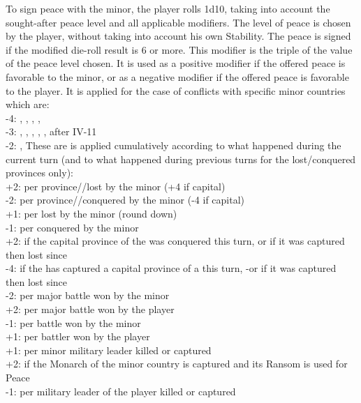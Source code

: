\aparag[Method]
To sign peace with the minor, the player rolls 1d10, taking into account the
sought-after peace level and all applicable modifiers. The level of peace is
chosen by the player, without taking into account his own Stability.
\bparag[Result]
The peace is signed if the modified die-roll result is 6 or more.
This modifier is the triple of the value of the peace level chosen. It is used
as a positive modifier if the offered peace is favorable to the minor, or as a
negative modifier if the offered peace is favorable to the player.
It is applied for the case of conflicts with specific minor countries
which are: \\
-4: , , , ,
 \\
-3: , , , ,
,   after IV-11\\
-2: , 
These are is applied cumulatively according to what happened during the
current turn (and to what happened during previous turns for the
lost/conquered provinces only):\\
+2:	per province/\TP\faceplus/\COL lost by the minor (+4 if capital)\\
-2:	per province/\TP\faceplus/\COL conquered by the minor (-4 if capital) \\
+1:	per \TP\facemoins  lost by the minor (round down) \\
-1:	per \TP\facemoins conquered by the minor \\
+2: if the capital province of the \MIN was conquered this turn, or if it was
captured then lost since \\
-4: if the \MIN has captured a capital province of a \MAJ this turn, -or if it
was
captured then lost since \\
-2:	per major battle won by the minor  \\
+2:	per major battle won by the player \\
-1:	per battle won by the minor \\
+1:	per battler won by the player\\
+1:	per minor military leader killed or captured \\
+2: if the Monarch of the minor country is captured and its Ransom is
used for Peace \\
-1:	per military leader of the player killed or captured\\

